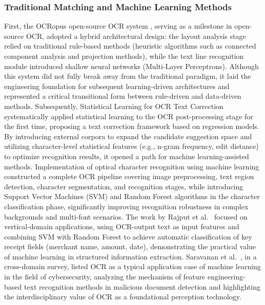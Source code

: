 \subsubsection{Traditional Matching and Machine Learning Methods}
First, the OCRopus open-source OCR system \cite{ocropus2008}, serving as a milestone in open-source OCR, adopted a hybrid architectural design: the layout analysis stage relied on traditional rule-based methods (heuristic algorithms such as connected component analysis and projection methods), while the text line recognition module introduced shallow neural networks (Multi-Layer Perceptrons). Although this system did not fully break away from the traditional paradigm, it laid the engineering foundation for subsequent learning-driven architectures and represented a critical transitional form between rule-driven and data-driven methods. Subsequently, Statistical Learning for OCR Text Correction \cite{tong2014statistical} systematically applied statistical learning to the OCR post-processing stage for the first time, proposing a text correction framework based on regression models. By introducing external corpora to expand the candidate suggestion space and utilizing character-level statistical features (e.g., n-gram frequency, edit distance) to optimize recognition results, it opened a path for machine learning-assisted methods. Implementation of optical character recognition using machine learning \cite{kumar2014implementation} constructed a complete OCR pipeline covering image preprocessing, text region detection, character segmentation, and recognition stages, while introducing Support Vector Machines (SVM) and Random Forest algorithms in the character classification phase, significantly improving recognition robustness in complex backgrounds and multi-font scenarios. The work by Rajput et al.~\cite{rajput2016receipt} focused on vertical-domain applications, using OCR-output text as input features and combining SVM with Random Forest to achieve automatic classification of key receipt fields (merchant name, amount, date), demonstrating the practical value of machine learning in structured information extraction. Saravanan et al.~\cite{saravanan2019cybersecurity}, in a cross-domain survey, listed OCR as a typical application case of machine learning in the field of cybersecurity, analyzing the mechanism of feature engineering-based text recognition methods in malicious document detection and highlighting the interdisciplinary value of OCR as a foundational perception technology.


